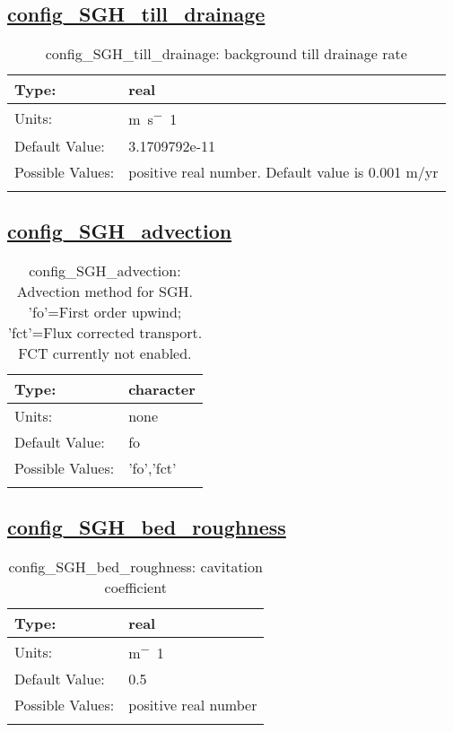 \subsection[config\_SGH\_till\_drainage]{\hyperref[sec:nm_tab_subglacial_hydro]{config\_SGH\_till\_drainage}}
\label{subsec:nm_sec_config_SGH_till_drainage}
\begin{center}
\begin{longtable}{| p{2.0in} || p{4.0in} |}
    \hline
    Type: & real \\
    \hline
    Units: & \si{m.s^-1} \\
    \hline
    Default Value: & 3.1709792e-11 \\
    \hline
    Possible Values: & positive real number.  Default value is 0.001 m/yr \\
    \hline
    \caption{config\_SGH\_till\_drainage: background till drainage rate}
\end{longtable}
\end{center}
\subsection[config\_SGH\_advection]{\hyperref[sec:nm_tab_subglacial_hydro]{config\_SGH\_advection}}
\label{subsec:nm_sec_config_SGH_advection}
\begin{center}
\begin{longtable}{| p{2.0in} || p{4.0in} |}
    \hline
    Type: & character \\
    \hline
    Units: & \si{none} \\
    \hline
    Default Value: & fo \\
    \hline
    Possible Values: & 'fo','fct' \\
    \hline
    \caption{config\_SGH\_advection: Advection method for SGH.  'fo'=First order upwind; 'fct'=Flux corrected transport.  FCT currently not enabled.}
\end{longtable}
\end{center}
\subsection[config\_SGH\_bed\_roughness]{\hyperref[sec:nm_tab_subglacial_hydro]{config\_SGH\_bed\_roughness}}
\label{subsec:nm_sec_config_SGH_bed_roughness}
\begin{center}
\begin{longtable}{| p{2.0in} || p{4.0in} |}
    \hline
    Type: & real \\
    \hline
    Units: & \si{m^-1} \\
    \hline
    Default Value: & 0.5 \\
    \hline
    Possible Values: & positive real number \\
    \hline
    \caption{config\_SGH\_bed\_roughness: cavitation coefficient}
\end{longtable}
\end{center}
